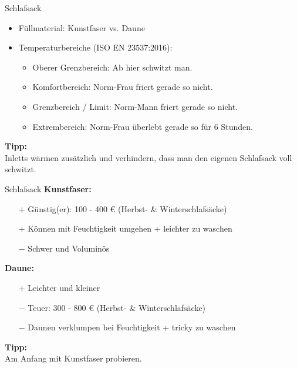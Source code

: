 \documentclass[aspectratio=169]{beamer}
\newcommand{\tipp}[2][Tipp]{\vspace{0.2cm}\textbf{#1:}\\#2}
\begin{document}
			\begin{frame}{Schlafsack}
				\begin{itemize}
					\item Füllmaterial: Kunstfaser vs. Daune
					\item Temperaturbereiche (ISO EN 23537:2016):
					\begin{itemize}
						\item Oberer Grenzbereich: Ab hier schwitzt man.
						\item Komfortbereich: Norm-Frau friert gerade so nicht.
						\item Grenzbereich / Limit: Norm-Mann friert gerade so nicht.
						\item Extrembereich: Norm-Frau überlebt gerade so für 6 Stunden.
					\end{itemize}
				\end{itemize}\pause
				\tipp{Inletts wärmen zusätzlich und verhindern, dass man den eigenen Schlafsack voll schwitzt.}
			\end{frame}
			
			\begin{frame}{Schlafsack}
				\textbf{Kunstfaser:}
				\begin{itemize}
					\item[$+$] Günstig(er): 100 - 400 € (Herbst- \& Winterschlafsäcke)
					\item[$+$] Können mit Feuchtigkeit umgehen + leichter zu waschen
					\item[$-$] Schwer und Voluminös
				\end{itemize}\pause
				\textbf{Daune:}
				\begin{itemize}
					\item[$+$] Leichter und kleiner
					\item[$-$] Teuer: 300 - 800 € (Herbst- \& Winterschlafsäcke)
					\item[$-$] Daunen verklumpen bei Feuchtigkeit + tricky zu waschen
				\end{itemize}\pause
				\tipp{Am Anfang mit Kunstfaser probieren.}
			\end{frame}
			
			
			
\end{document}
